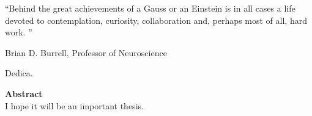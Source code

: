 \documentclass[12pt,a4paper]{report}
\begin{document}
\newpage
\thispagestyle{empty}
\mbox{}
\newpage





\thispagestyle{empty} %
 \epigraph{``Behind the great achievements of a Gauss or an Einstein is in all cases a life devoted to contemplation, curiosity, collaboration and, perhaps most of all, hard work.
''\footnotemark}{Brian D. Burrell, Professor of Neuroscience}




\newpage
\thispagestyle{empty}
\mbox{}
\newpage

\thispagestyle{empty}
\begin{flushright}
 Dedica.
\end{flushright}

\newpage
\thispagestyle{empty}
\mbox{}
\newpage


\begin{flushleft}
{\LARGE{\bf Abstract}}\\
\vspace{9mm}
I hope it will be an important thesis.
\end{flushleft}
\thispagestyle{empty}
\clearpage
{}
\end{document}

